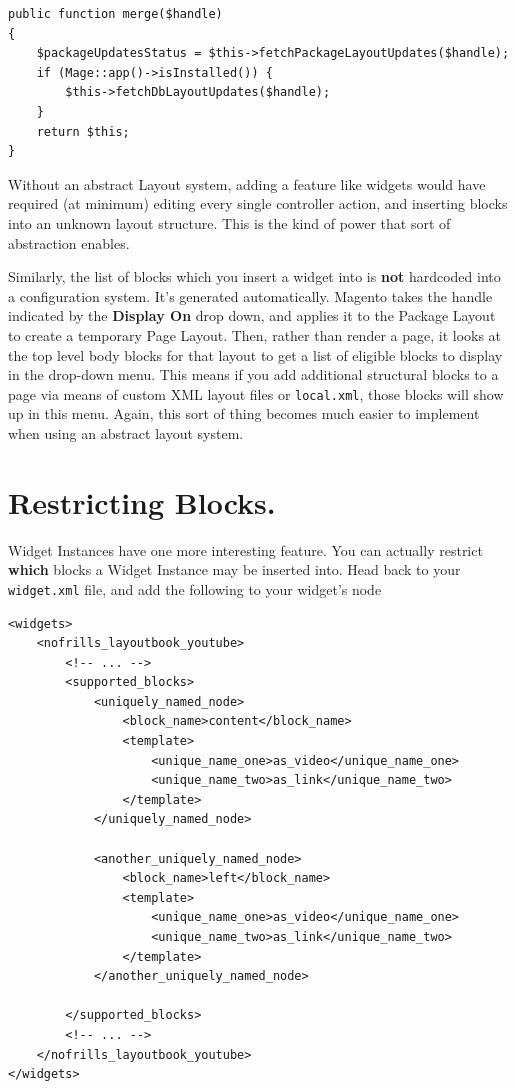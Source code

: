 \documentclass[oneside]{book}
\begin{document}
\begin{lstlisting}
public function merge($handle)
{
    $packageUpdatesStatus = $this->fetchPackageLayoutUpdates($handle);
    if (Mage::app()->isInstalled()) {
        $this->fetchDbLayoutUpdates($handle);
    }
    return $this;
}

\end{lstlisting}


Without an abstract Layout system, adding a feature like widgets would have required (at minimum) editing every single controller action, and inserting blocks into an unknown layout structure. This is the kind of power that sort of abstraction enables.

Similarly, the list of blocks which you insert a widget into is \textbf{not} hardcoded into a configuration system.  It's generated automatically.  Magento takes the handle indicated by the \textbf{Display On} drop down, and applies it to the Package Layout to create a temporary Page Layout.  Then, rather than render a page, it looks at the top level body blocks for that layout to get a list of eligible blocks to display in the drop-down menu.  This means if you add additional structural blocks to a page via means of custom XML layout files or \footnotesize\texttt{local.xml}\normalsize, those blocks will show up in this menu.  Again, this sort of thing becomes much easier to implement when using an abstract layout system.

\section{Restricting Blocks.}

Widget Instances have one more interesting feature.  You can actually restrict \textbf{which} blocks a Widget Instance may be inserted into.  Head back to your \footnotesize\texttt{widget.xml} \normalsize  file, and add the following to  your widget's node

\begin{lstlisting}
<widgets>
    <nofrills_layoutbook_youtube>
        <!-- ... -->
        <supported_blocks>
            <uniquely_named_node>
                <block_name>content</block_name>
                <template>
                    <unique_name_one>as_video</unique_name_one>
                    <unique_name_two>as_link</unique_name_two>
                </template>
            </uniquely_named_node>

            <another_uniquely_named_node>
                <block_name>left</block_name>
                <template>
                    <unique_name_one>as_video</unique_name_one>
                    <unique_name_two>as_link</unique_name_two>
                </template>
            </another_uniquely_named_node>

        </supported_blocks>
        <!-- ... -->
    </nofrills_layoutbook_youtube>
</widgets>

\end{lstlisting}
\end{document}
